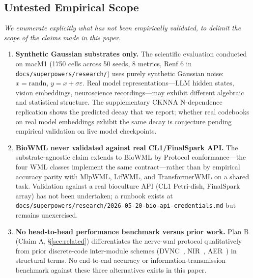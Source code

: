 \documentclass[10pt,twocolumn]{article}
\begin{document}
\subsection{Untested Empirical Scope}

\emph{We enumerate explicitly what has not been empirically validated, to delimit the scope of the claims made in this paper.}

\begin{enumerate}
\item \textbf{Synthetic Gaussian substrates only.} The scientific evaluation conducted on macM1 (1750 cells across 50 seeds, 8 metrics, Renf 6 in \texttt{docs/superpowers/research/}) uses purely synthetic Gaussian noise: $x = \mathrm{randn}$, $y = x + \sigma\varepsilon$. Real model representations---LLM hidden states, vision embeddings, neuroscience recordings---may exhibit different algebraic and statistical structure. The supplementary CKNNA N-dependence replication shows the predicted decay that we report; whether real codebooks on real model embeddings exhibit the same decay is conjecture pending empirical validation on live model checkpoints.

\item \textbf{BioWML never validated against real CL1/FinalSpark API.} The substrate-agnostic claim extends to BioWML by Protocol conformance---the four WML classes implement the same contract---rather than by empirical accuracy parity with MlpWML, LifWML, and TransformerWML on a shared task. Validation against a real bioculture API (CL1 Petri-dish, FinalSpark array) has not been undertaken; a runbook exists at \texttt{docs/superpowers/research/2026-05-20-bio-api-credentials.md} but remains unexercised.

\item \textbf{No head-to-head performance benchmark versus prior work.} Plan B (Claim A, \S\ref{sec:related}) differentiates the nerve-wml protocol qualitatively from prior discrete-code inter-module schemes (DVNC~\cite{liu2021dvnc}, NIR~\cite{pedersen2024nir}, AER~\cite{aer2025biohybrid}) in structural terms. No end-to-end accuracy or information-transmission benchmark against these three alternatives exists in this paper.


\end{enumerate}
\end{document}
